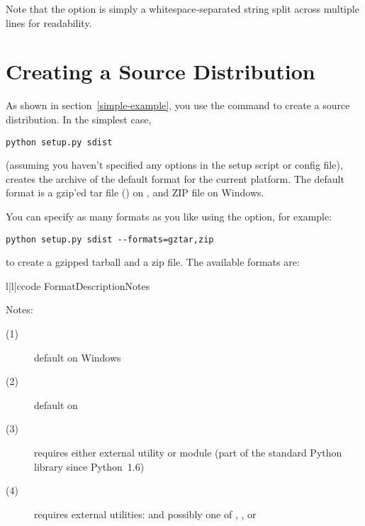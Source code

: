 \documentclass{manual}
\begin{document}
Note that the  option is simply a
whitespace-separated string split across multiple lines for readability.


\begin{seealso}
\end{seealso}


\chapter{Creating a Source Distribution}
\label{source-dist}

As shown in section~\ref{simple-example}, you use the
 command to create a source distribution.  In the
simplest case,

\begin{verbatim}
python setup.py sdist
\end{verbatim}

(assuming you haven't specified any  options in the setup
script or config file),  creates the archive of the
default format for the current platform.  The default format is a gzip'ed
tar file () on \UNIX, and ZIP file on Windows.

You can specify as many formats as you like using the
 option, for example:

\begin{verbatim}
python setup.py sdist --formats=gztar,zip
\end{verbatim}

to create a gzipped tarball and a zip file.  The available formats are:

\begin{tableiii}{l|l|c}{code}%
  {Format}{Description}{Notes}
\end{tableiii}

\noindent Notes:
\begin{description}
\item[(1)] default on Windows
\item[(2)] default on \UNIX
\item[(3)] requires either external  utility or
   module (part of the standard Python library since
  Python~1.6)
\item[(4)] requires external utilities:  and possibly one
  of , , or 
\end{description}
\end{document}
